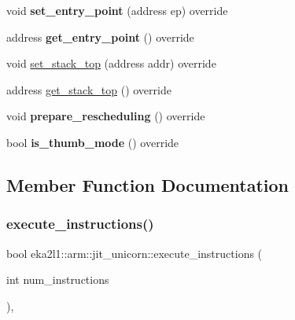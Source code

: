 \begin{DoxyCompactItemize}
\item 
\mbox{\label{classeka2l1_1_1arm_1_1jit__unicorn_a21a5f411d4be7c50c16d7b85e1c97029}} 
void {\bfseries set\+\_\+entry\+\_\+point} (address ep) override
\item 
\mbox{\label{classeka2l1_1_1arm_1_1jit__unicorn_a305e5b94d7e1167b8fdd7c23266e940c}} 
address {\bfseries get\+\_\+entry\+\_\+point} () override
\item 
void \mbox{\hyperlink{classeka2l1_1_1arm_1_1jit__unicorn_a472a7da1849c941894cf684163fd0006}{set\+\_\+stack\+\_\+top}} (address addr) override
\item 
address \mbox{\hyperlink{classeka2l1_1_1arm_1_1jit__unicorn_a373f8707fc8bd946e841758c637d3104}{get\+\_\+stack\+\_\+top}} () override
\item 
\mbox{\label{classeka2l1_1_1arm_1_1jit__unicorn_a474dcb5a267a7637d5b84c595df1c6b5}} 
void {\bfseries prepare\+\_\+rescheduling} () override
\item 
\mbox{\label{classeka2l1_1_1arm_1_1jit__unicorn_a2d78be450b3c381024895a3fc503305d}} 
bool {\bfseries is\+\_\+thumb\+\_\+mode} () override
\end{DoxyCompactItemize}


\subsection{Member Function Documentation}
\mbox{\label{classeka2l1_1_1arm_1_1jit__unicorn_a3a03be2a0e9c1ea1f83b74fdcdc3c7ce}} 
\subsubsection{\texorpdfstring{execute\+\_\+instructions()}{execute\_instructions()}}
{\footnotesize\ttfamily bool eka2l1\+::arm\+::jit\+\_\+unicorn\+::execute\+\_\+instructions (\begin{DoxyParamCaption}\item[{int}]{num\+\_\+instructions }\end{DoxyParamCaption})\hspace{0.3cm}{\ttfamily [override]}, {\ttfamily [virtual]}}

